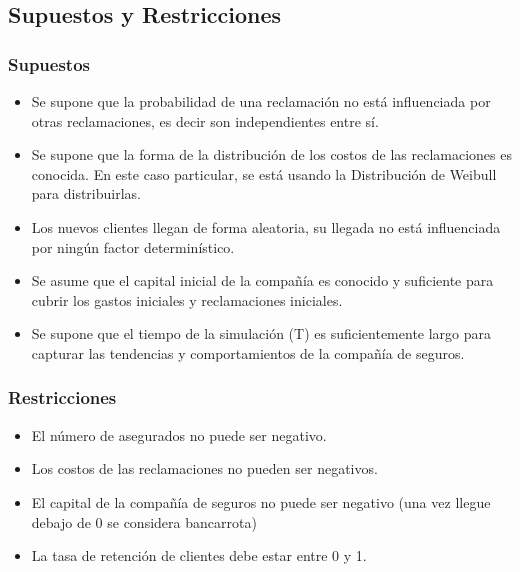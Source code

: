 \documentclass{article}
\begin{document}
\subsection{Supuestos y Restricciones}
\subsubsection{Supuestos}
\begin{itemize}
    \item Se supone que la probabilidad de una reclamación no está influenciada por otras reclamaciones, es decir son independientes entre sí.
    \item Se supone que la forma de la distribución de los costos de las reclamaciones es conocida. En este caso particular, se está usando la Distribución de Weibull para distribuirlas. 
    \item Los nuevos clientes llegan de forma aleatoria, su llegada no está influenciada por ningún factor determinístico.
    \item  Se asume que el capital inicial de la compañía es conocido y suficiente para cubrir los gastos iniciales y reclamaciones iniciales.
    \item  Se supone que el tiempo de la simulación (T) es suficientemente largo para capturar las tendencias y comportamientos de la compañía de seguros.
\end{itemize}

\subsubsection{Restricciones}
\begin{itemize}
    \item El número de asegurados no puede ser negativo.
    \item Los costos de las reclamaciones no pueden ser negativos.
    \item El capital de la compañía de seguros no puede ser negativo (una vez llegue debajo de 0 se considera bancarrota)
    \item La tasa de retención de clientes debe estar entre 0 y 1.
\end{itemize}
\end{document}
